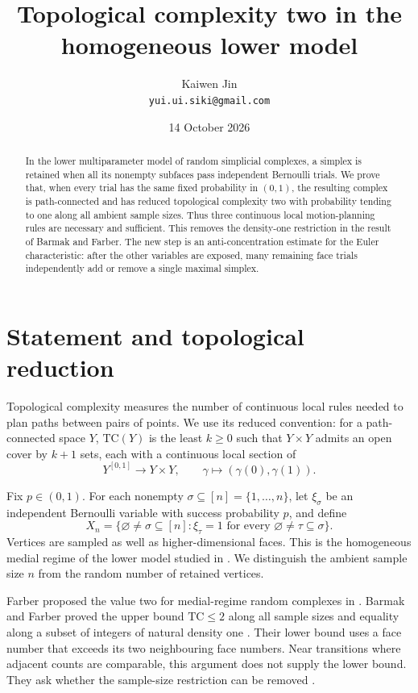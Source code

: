 \documentclass[11pt,a4paper]{article}
\title{Topological complexity two in the homogeneous lower model}
\author{Kaiwen Jin\\[2pt]\small\texttt{yui.ui.siki@gmail.com}}
\date{14 October 2026}
\newcommand{\TC}{\mathrm{TC}}
\begin{document}
\maketitle
\begin{abstract}
In the lower multiparameter model of random simplicial complexes, a simplex
is retained when all its nonempty subfaces pass independent Bernoulli trials.
We prove that, when every trial has the same fixed probability in $(0,1)$,
the resulting complex is path-connected and has reduced topological
complexity two with probability tending to one along all ambient sample
sizes. Thus three continuous local motion-planning rules are necessary and
sufficient. This removes the density-one restriction in the result of
Barmak and Farber. The new step is an anti-concentration estimate for the
Euler characteristic: after the other variables are exposed, many remaining
face trials independently add or remove a single maximal simplex.
\end{abstract}

\section{Statement and topological reduction}

Topological complexity measures the number of continuous local rules needed
to plan paths between pairs of points. We use its reduced convention:
for a path-connected space $Y$, $\TC(Y)$ is the least $k\ge0$ such that
$Y\times Y$ admits an open cover by $k+1$ sets, each with a continuous
local section of
\[
Y^{[0,1]}\longrightarrow Y\times Y,\qquad
\gamma\longmapsto(\gamma(0),\gamma(1)).
\]

Fix $p\in(0,1)$. For each nonempty $\sigma\subseteq[n]=\{1,\ldots,n\}$,
let $\xi_\sigma$ be an independent Bernoulli variable with success
probability $p$, and define
\begin{equation}\label{eq:model}
X_n=\{\varnothing\ne\sigma\subseteq[n]:
\xi_\tau=1\text{ for every }\varnothing\ne\tau\subseteq\sigma\}.
\end{equation}
Vertices are sampled as well as higher-dimensional faces. This is the
homogeneous medial regime of the lower model studied in
\cite{BF2026}. We distinguish the ambient sample size $n$ from the
random number of retained vertices.

Farber proposed the value two for medial-regime random complexes in
\cite[Remark~8.2]{Farber2024}. Barmak and Farber proved the upper bound
$\TC\le2$ along all sample sizes and equality along a subset of integers
of natural density one \cite[Theorems~16 and~19]{BF2026}. Their lower
bound uses a face number that exceeds its two neighbouring face numbers.
Near transitions where adjacent counts are comparable, this argument
does not supply the lower bound. They ask whether the sample-size
restriction can be removed \cite[\S10, Question~2]{BF2026}.
\end{document}
